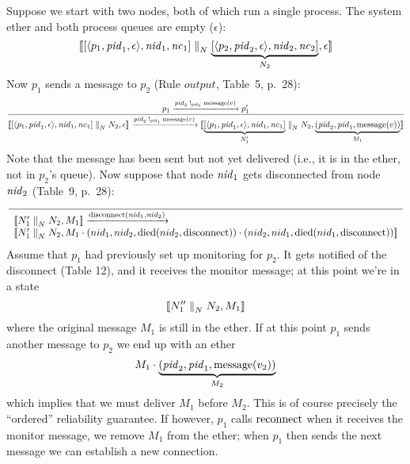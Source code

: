 \documentclass[10pt]{article}
\begin{document}
Suppose we start with two nodes, both of which run a single process. The system
ether and both process queues are empty ($\epsilon$): 
%
\begin{equation*}
\llbracket [ \langle p_1, \mathit{pid}_1, \epsilon \rangle, \mathit{nid}_1, \mathit{nc}_1 ] 
  \mathrel{{\parallel}_N} 
   \underbrace{[ \langle p_2, \mathit{pid}_2, \epsilon \rangle, \mathit{nid}_2, \mathit{nc}_2 ]}_{N_2}
  , \epsilon \rrbracket
\end{equation*}
%
Now $p_1$ sends a message to $p_2$ (Rule $\mathit{output}$, Table~5, p.~28):
%
\begin{equation*}
\frac{%
  p_1 \xrightarrow{\semPid_2 \; {!_{\semPid_1}} \; \semMessage(v)} p_1'
}{%
\semSystem
  {\semNode{\semProc{p_1}{\semPid_1}{\epsilon}}{\semNid_1}{\semNc_1} 
  \semParN 
   N_2 
  }
  {\epsilon}
\xrightarrow{\semPid_2 \; {!_{\semPid_1}} \; \semMessage(v)} 
\semSystem
  {\underbrace{\semNode{\semProc{p_1}{\semPid_1}{\epsilon}}{\semNid_1}{\semNc_1}}_{N_1'} 
  \semParN 
   N_2 
  }
  {\underbrace{(\semPid_2, \semPid_1, \semMessage(v))}_{M_1}}
}
\end{equation*}
%
Note that the message has been sent but not yet delivered (i.e., it is in the
ether, not in $p_2$'s queue). Now suppose that node $\mathit{nid}_1$ gets
disconnected from node $\mathit{nid}_2$ (Table~9, p.~28):
%
\begin{equation*}
\frac{%
}{%
\begin{array}{l}
\semSystem{N_1' \semParN N_2}{M_1} 
\xrightarrow{\semDisconnect(\semNid_1, \semNid_2)} \\
\semSystem{N_1' \semParN N_2}{M_1 \cdot (nid_1, nid_2, \semDied{nid_2}{\semDisconnect})
                                  \cdot (nid_2, nid_1, \semDied{nid_1}{\semDisconnect})}
\end{array}                                  
}
\end{equation*}
%
Assume that $p_1$ had previously set up monitoring for $p_2$. It gets notified of the disconnect (Table 12), and it receives the monitor message; at this point we're in a state
%
\begin{equation*}
\llbracket N_1'' \mathrel{{\parallel}_N} N_2, M_1 \rrbracket
\end{equation*}
%
where the original message $M_1$ is still in the ether. If at this point $p_1$ sends another message to $p_2$ we end up with an ether
%
\begin{equation*}
M_1 \cdot \underbrace{(\mathit{pid}_2, \mathit{pid}_1, \mathrm{message}(v_2))}_{M_2}
\end{equation*}
%
which implies that we must deliver $M_1$ before $M_2$. This is of course
precisely the ``ordered'' reliability guarantee. If however, $p_1$ calls
$\mathrm{reconnect}$ when it receives the monitor message, we remove $M_1$ from the ether;
when $p_1$ then sends the next message we can establish a new connection.
\end{document}
